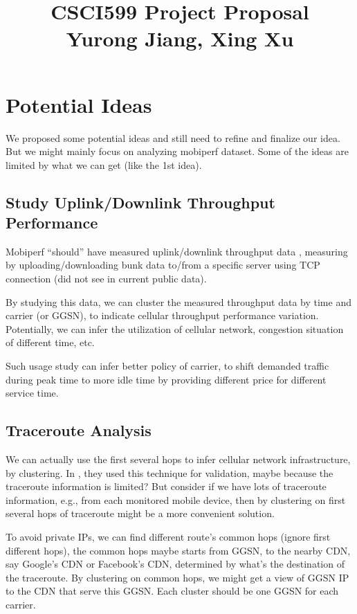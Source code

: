 \documentclass[]{article}
\begin{document}
\title{\textbf{CSCI599 Project Proposal} \\ Yurong Jiang, Xing Xu}
\maketitle

\section{Potential Ideas}

We proposed some potential ideas and still need to refine and finalize our idea. But we might mainly focus on analyzing mobiperf dataset. Some of the ideas are limited by what we can get (like the 1st idea).

\subsection{Study Uplink/Downlink Throughput Performance}

Mobiperf ``should'' have measured uplink/downlink throughput data \cite{mobiperf}, measuring by uploading/downloading bunk data to/from a specific server using TCP connection (did not see in current public data).

By studying this data, we can cluster the measured throughput data by time and carrier (or GGSN), to indicate cellular throughput performance variation. Potentially, we can infer the utilization of cellular network, congestion situation of different time, etc.

Such usage study can infer better policy of carrier, to shift demanded traffic during peak time to more idle time by providing different price for different service time.

\subsection{Traceroute Analysis}

We can actually use the first several hops to infer cellular network infrastructure, by clustering. In \cite{infer}, they used this technique for validation, maybe because the traceroute information is limited? But consider if we have lots of traceroute information, e.g., from each monitored mobile device, then by clustering on first several hops of traceroute might be a more convenient solution.

To avoid private IPs, we can find different route's common hops (ignore first different hops), the common hops maybe starts from GGSN, to the nearby CDN, say Google's CDN or Facebook's CDN, determined by what's the destination of the traceroute. By clustering on common hops, we might get a view of GGSN IP to the CDN that serve this GGSN. Each cluster should be one GGSN for each carrier.
\end{document}
